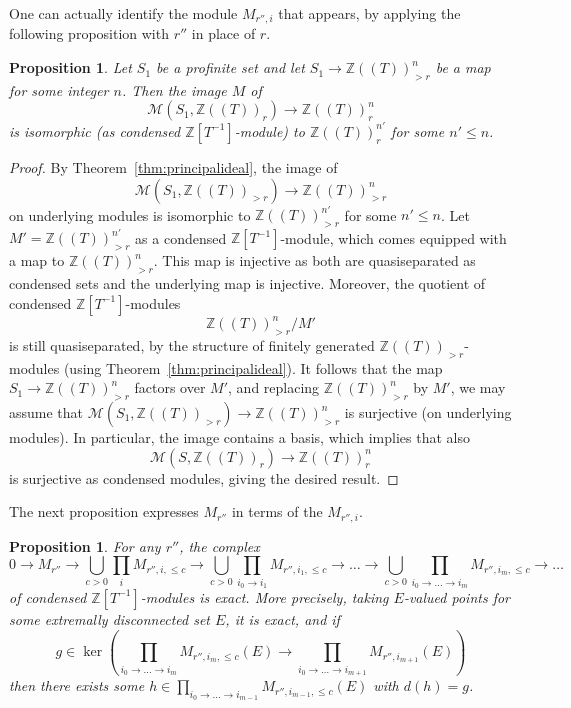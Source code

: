 \documentclass[11pt]{amsbook}
\numberwithin{equation}{section}
\numberwithin{theorem}{section}
\newtheorem{proposition}[theorem]{Proposition}
\theoremstyle{definition}
\begin{document}
One can actually identify the module $M_{r'',i}$ that appears, by applying the following proposition with $r''$ in place of $r$.

\begin{proposition}\label{prop:imagefree} Let $S_1$ be a profinite set and let $S_1\to \mathbb Z((T))_{>r}^n$ be a map for some integer $n$. Then the image $M$ of
\[
\mathcal M(S_1,\mathbb Z((T))_r)\to \mathbb Z((T))_r^n
\]
is isomorphic (as condensed $\mathbb Z[T^{-1}]$-module) to $\mathbb Z((T))_r^{n'}$ for some $n'\leq n$.
\end{proposition}

\begin{proof} By Theorem~\ref{thm:principalideal}, the image of
\[
\mathcal M(S_1,\mathbb Z((T))_{>r})\to \mathbb Z((T))_{>r}^n
\]
on underlying modules is isomorphic to $\mathbb Z((T))_{>r}^{n'}$ for some $n'\leq n$. Let $M'=\mathbb Z((T))_{>r}^{n'}$ as a condensed $\mathbb Z[T^{-1}]$-module, which comes equipped with a map to $\mathbb Z((T))_{>r}^n$. This map is injective as both are quasiseparated as condensed sets and the underlying map is injective. Moreover, the quotient of condensed $\mathbb Z[T^{-1}]$-modules
\[
\mathbb Z((T))_{>r}^n/M'
\]
is still quasiseparated, by the structure of finitely generated $\mathbb Z((T))_{>r}$-modules (using Theorem~\ref{thm:principalideal}). It follows that the map $S_1\to \mathbb Z((T))_{>r}^n$ factors over $M'$, and replacing $\mathbb Z((T))_{>r}^n$ by $M'$, we may assume that $\mathcal M(S_1,\mathbb Z((T))_{>r})\to \mathbb Z((T))_{>r}^n$ is surjective (on underlying modules). In particular, the image contains a basis, which implies that also
\[
\mathcal M(S,\mathbb Z((T))_r)\to \mathbb Z((T))_r^n
\]
is surjective as condensed modules, giving the desired result.
\end{proof}

The next proposition expresses $M_{r''}$ in terms of the $M_{r'',i}$.

\begin{proposition} For any $r''$, the complex
\[
0\to M_{r''}\to \bigcup_{c>0}\prod_i M_{r'',i,\leq c}\to \bigcup_{c>0} \prod_{i_0\to i_1} M_{r'',i_1,\leq c}\to \ldots\to \bigcup_{c>0} \prod_{i_0\to \ldots\to i_m} M_{r'',i_m,\leq c}\to \ldots
\]
of condensed $\mathbb Z[T^{-1}]$-modules is exact. More precisely, taking $E$-valued points for some extremally disconnected set $E$, it is exact, and if
\[
g\in \ker(\prod_{i_0\to\ldots\to i_m} M_{r'',i_m,\leq c}(E)\to \prod_{i_0\to\ldots\to i_{m+1}} M_{r'',i_{m+1}}(E))
\]
then there exists some $h\in \prod_{i_0\to\ldots\to i_{m-1}} M_{r'',i_{m-1},\leq c}(E)$ with $d(h)=g$.
\end{proposition}
\end{document}
